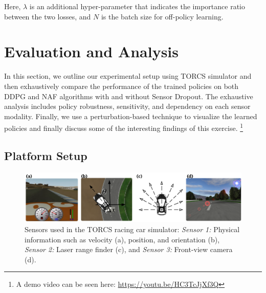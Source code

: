 \documentclass[../thesis.tex]{subfiles}
\begin{document}
Here, $\lambda$ is an additional hyper-parameter that indicates the importance ratio between the two losses, and $N$ is the batch size for off-policy learning.
 
 
 
 
 
\section{Evaluation and Analysis} \label{sec:mdrl-results}
In this section, we outline our experimental setup using TORCS simulator and then exhaustively compare the performance of the trained policies on both DDPG and NAF algorithms with and without Sensor Dropout. The exhaustive analysis includes policy robustness, sensitivity, and dependency on each sensor modality. Finally, we use a perturbation-based technique to visualize the learned policies and finally discuss some of the interesting findings of this exercise.
\footnote{A demo video can be seen here: \url{https://youtu.be/HC3TcJjXf3Q}}
 
\subsection{Platform Setup} \label{sec:platform}
 
\begin{figure}[t]
    	\centering
    	\vskip 0.2in
\includegraphics[width=\columnwidth]{./MultimodalDRL/fig/TORCS.png} %
    	\caption{Sensors used in the TORCS racing car simulator: \textit{Sensor 1:} Physical information such as velocity (a), position, and orientation (b), \textit{Sensor 2:} Laser range finder (c), and \textit{Sensor 3:} Front-view camera (d).}
    	\label{fig:TORCS}
\end{figure}
 
\end{document}

